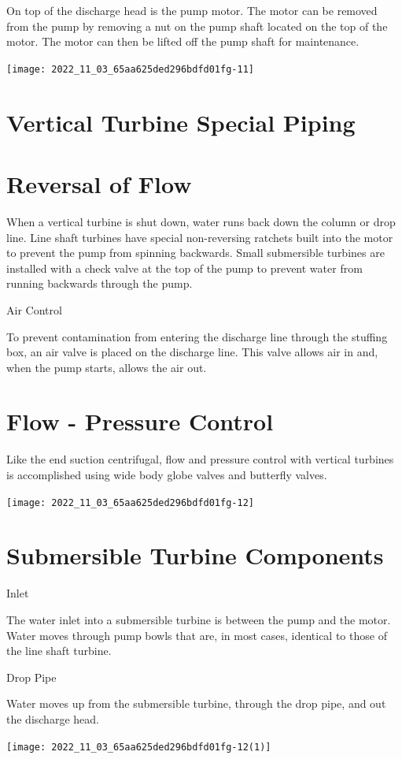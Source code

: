 \documentclass[10pt]{article}
\begin{document}
On top of the discharge head is the pump motor. The motor can be removed from the pump by removing a nut on the pump shaft located on the top of the motor. The motor can then be lifted off the pump shaft for maintenance.

\texttt{[image: 2022\_11\_03\_65aa625ded296bdfd01fg-11]}

\section{Vertical Turbine Special Piping}
\section{Reversal of Flow}
When a vertical turbine is shut down, water runs back down the column or drop line. Line shaft turbines have special non-reversing ratchets built into the motor to prevent the pump from spinning backwards. Small submersible turbines are installed with a check valve at the top of the pump to prevent water from running backwards through the pump.

Air Control

To prevent contamination from entering the discharge line through the stuffing box, an air valve is placed on the discharge line. This valve allows air in and, when the pump starts, allows the air out.

\section{Flow - Pressure Control}
Like the end suction centrifugal, flow and pressure control with vertical turbines is accomplished using wide body globe valves and butterfly valves.

\texttt{[image: 2022\_11\_03\_65aa625ded296bdfd01fg-12]}

\section{Submersible Turbine Components}
Inlet

The water inlet into a submersible turbine is between the pump and the motor. Water moves through pump bowls that are, in most cases, identical to those of the line shaft turbine.

Drop Pipe

Water moves up from the submersible turbine, through the drop pipe, and out the discharge head.

\texttt{[image: 2022\_11\_03\_65aa625ded296bdfd01fg-12(1)]}
\end{document}
